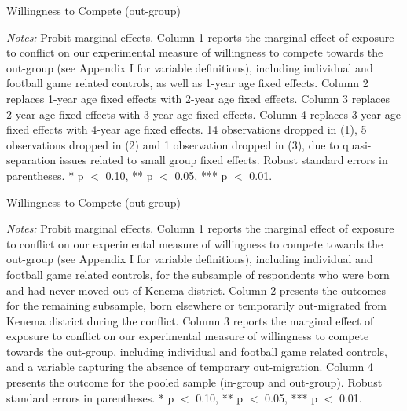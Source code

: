 \begin{threeparttable}[p!]
	\caption{Willingness to Compete (out-group)}
	\label{tab:slf:compete_fe}
	\centering
	\tiny
	
	\begin{tablenotes}
		\item \textit{Notes:} Probit marginal effects. Column 1 reports the marginal effect of exposure to conflict on our experimental measure of willingness to compete towards the out-group (see Appendix I for variable definitions), including individual and football game related controls, as well as 1-year age fixed effects. Column 2 replaces 1-year age fixed effects with 2-year age fixed effects. Column 3 replaces 2-year age fixed effects with 3-year age fixed effects. Column 4 replaces 3-year age fixed effects with 4-year age fixed effects. 14 observations dropped in (1), 5 observations dropped in (2) and 1 observation dropped in (3), due to quasi-separation issues related to small group fixed effects. Robust standard errors in parentheses. * p $<$ 0.10, ** p $<$ 0.05, *** p $<$ 0.01.
		\item
	\end{tablenotes}
\end{threeparttable}

\pagebreak

\begin{threeparttable}[p!]
	\caption{Willingness to Compete (out-group)}
	\label{tab:slf:compete_migrate}
	\centering
	\tiny
	
	\begin{tablenotes}
		\item \textit{Notes:} Probit marginal effects. Column 1 reports the marginal effect of exposure to conflict on our experimental measure of willingness to compete towards the out-group (see Appendix I for variable definitions), including individual and football game related controls, for the subsample of respondents who were born and had never moved out of Kenema district. Column 2 presents the outcomes for the remaining subsample, born elsewhere or temporarily out-migrated from Kenema district during the conflict. Column 3 reports the marginal effect of exposure to conflict on our experimental measure of willingness to compete towards the out-group, including individual and football game related controls, and a variable capturing the absence of temporary out-migration. Column 4 presents the outcome for the pooled sample (in-group and out-group). Robust standard errors in parentheses. * p $<$ 0.10, ** p $<$ 0.05, *** p $<$ 0.01.
		\item
	\end{tablenotes}
\end{threeparttable}


